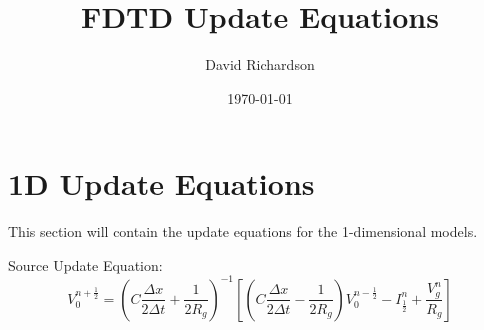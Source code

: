 \documentclass{article}
\title{FDTD Update Equations}
\author{David Richardson}
\date{\today}
\begin{document}
\maketitle

\section{1D Update Equations}

This section will contain the update equations for the 1-dimensional models.

Source Update Equation:
\begin{equation}
    V_0^{n+\frac{1}{2}}=(C\frac{\Delta x}{2\Delta t}+\frac{1}{2R_g})^{-1}
    [(C\frac{\Delta x}{2\Delta
    t}-\frac{1}{2R_g})V_0^{n-\frac{1}{2}}-I_{\frac{1}{2}}^n+\frac{V_g^n}{R_g}]
\end{equation}
\end{document}
